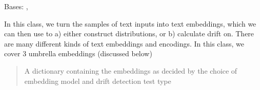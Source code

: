 \documentclass[letterpaper,10pt,english]{sphinxmanual}
\begin{document}
\begin{fulllineitems}
\label{\detokenize{fldModules/embedding:embedding.embedding}}
\pysigstartsignatures
{}
\pysigstopsignatures
\sphinxAtStartPar
Bases: {\hyperref[\detokenize{baseModules/sampling:sampling.samplingData}]{}}, {\hyperref[\detokenize{baseModules/base:base.detectorParent}]{}}

\begin{fulllineitems}
\label{\detokenize{fldModules/embedding:embedding.embedding.__init__}}
\pysigstartsignatures
{}
\pysigstopsignatures
\sphinxAtStartPar
In this class, we turn the samples of text inputs into text embeddings, which we can then use
to a) either construct distributions, or b) calculate drift on. There are many different kinds
of text embeddings and encodings. In this class, we cover 3 umbrella embeddings (discussed below)
\begin{quote}\begin{description}
\sphinxAtStartPar
A dictionary containing the embeddings as decided by the choice of embedding model and drift detection test type

\end{description}\end{quote}

\end{fulllineitems}



\end{fulllineitems}
\end{document}
